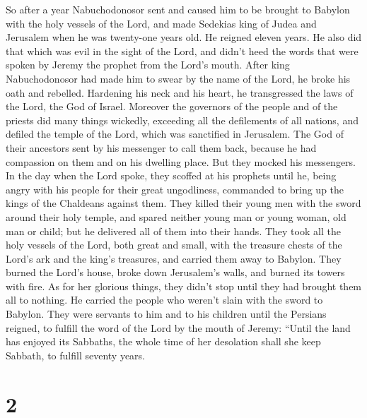  So after a year Nabuchodonosor sent and caused him to be
brought to Babylon with the holy vessels of the Lord, 
and made Sedekias king of Judea and Jerusalem when he was twenty-one
years old. He reigned eleven years.  He also did that
which was evil in the sight of the Lord, and didn't heed the words that
were spoken by Jeremy the prophet from the Lord's mouth. 
After king Nabuchodonosor had made him to swear by the name of the Lord,
he broke his oath and rebelled. Hardening his neck and his heart, he
transgressed the laws of the Lord, the God of Israel. 
Moreover the governors of the people and of the priests did many things
wickedly, exceeding all the defilements of all nations, and defiled the
temple of the Lord, which was sanctified in Jerusalem. 
The God of their ancestors sent by his messenger to call them back,
because he had compassion on them and on his dwelling place.
 But they mocked his messengers. In the day when the Lord
spoke, they scoffed at his prophets  until he, being
angry with his people for their great ungodliness, commanded to bring up
the kings of the Chaldeans against them.  They killed
their young men with the sword around their holy temple, and spared
neither young man or young woman, old man or child; but he delivered all
of them into their hands.  They took all the holy vessels
of the Lord, both great and small, with the treasure chests of the
Lord's ark and the king's treasures, and carried them away to Babylon.
 They burned the Lord's house, broke down Jerusalem's
walls, and burned its towers with fire.  As for her
glorious things, they didn't stop until they had brought them all to
nothing. He carried the people who weren't slain with the sword to
Babylon.  They were servants to him and to his children
until the Persians reigned, to fulfill the word of the Lord by the mouth
of Jeremy:  ``Until the land has enjoyed its Sabbaths,
the whole time of her desolation shall she keep Sabbath, to fulfill
seventy years.

\hypertarget{section-1}{%
\section{2}\label{section-1}}

